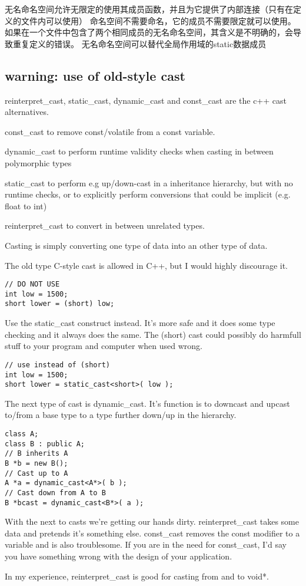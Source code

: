 无名命名空间允许无限定的使用其成员函数，并且为它提供了内部连接（只有在定义的文件内可以使用）
命名空间不需要命名，它的成员不需要限定就可以使用。
如果在一个文件中包含了两个相同成员的无名命名空间，其含义是不明确的，会导致重复定义的错误。
无名命名空间可以替代全局作用域的static数据成员

\subsection{warning: use of old-style cast}
reinterpret\_cast, static\_cast, dynamic\_cast and const\_cast are the c++ cast alternatives.

const\_cast to remove const/volatile from a const variable.

dynamic\_cast to perform runtime validity checks when casting in between polymorphic types

static\_cast to perform e.g up/down-cast in a inheritance hierarchy, but with no runtime checks, or to explicitly perform conversions that could be implicit (e.g. float to int)

reinterpret\_cast to convert in between unrelated types.

Casting is simply converting one type of data into an other type of data.

The old type C-style cast is allowed in C++, but I would highly discourage it.

\begin{lstlisting}
// DO NOT USE
int low = 1500;
short lower = (short) low;    
\end{lstlisting}

Use the static\_cast construct instead. It’s more safe and it does some type checking and it always does the same. The (short) cast could possibly do harmfull stuff to your program and computer when used wrong.

\begin{lstlisting}
// use instead of (short)
int low = 1500;
short lower = static_cast<short>( low );    
\end{lstlisting}

The next type of cast is dynamic\_cast. It’s function is to downcast and upcast to/from a base type to a type further down/up in the hierarchy.

\begin{lstlisting}
class A;
class B : public A;
// B inherits A
B *b = new B();
// Cast up to A
A *a = dynamic_cast<A*>( b );
// Cast down from A to B
B *bcast = dynamic_cast<B*>( a );   
\end{lstlisting}

With the next to casts we’re getting our hands dirty. reinterpret\_cast takes some data and pretends it’s something else. const\_cast removes the const modifier to a variable and is also troublesome. If you are in the need for const\_cast, I’d say you have something wrong with the design of your application.

In my experience, reinterpret\_cast is good for casting from and to void*.